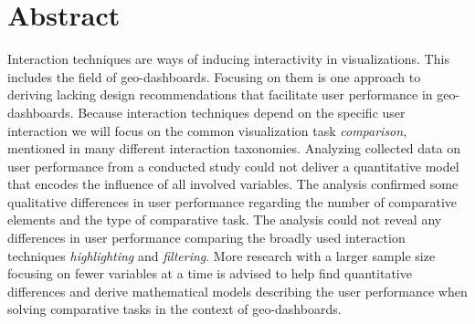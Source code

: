 \chapter*{Abstract}
Interaction techniques are ways of inducing interactivity in visualizations. This includes the field of geo-dashboards.
Focusing on them is one approach to deriving lacking design recommendations that facilitate user performance in geo-dashboards.
Because interaction techniques depend on the specific user interaction we will focus on the common
visualization task \textit{comparison}, mentioned in many different interaction taxonomies. Analyzing collected data on user
performance from a conducted study could not deliver a quantitative model that encodes the influence of all involved variables.
The analysis confirmed some qualitative differences in user performance regarding the number of comparative elements and the type
of comparative task. The analysis could not reveal any differences in user performance comparing the broadly used interaction techniques
\textit{highlighting} and \textit{filtering}. More research with a larger sample size focusing on fewer variables at a time is
advised to help find quantitative differences and derive mathematical models describing the user performance when solving comparative
tasks in the context of geo-dashboards.
